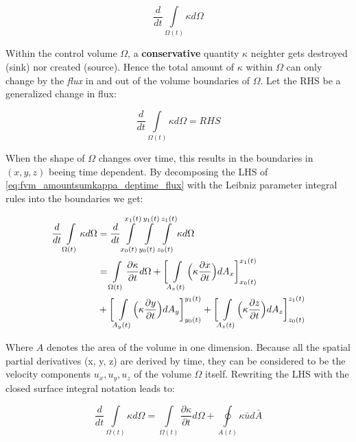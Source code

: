 \begin{equation}\label{eq:fvm_amountsumkappa_deptime}
\frac {d}{dt} \int\limits_{\Omega (t)} \kappa d \Omega
\end{equation}

Within the control volume $\Omega$, a \textbf{conservative} quantity $\kappa$  neighter gets destroyed (sink) nor created (source). Hence the total amount of 
$\kappa$ within $\Omega$ can only change by the \emph{flux} in and out of the volume boundaries of $\Omega$. Let the RHS be a generalized change in flux:

\begin{equation}\label{eq:fvm_amountsumkappa_deptime_flux}
\frac {d}{dt} \int\limits_{\Omega (t)} \kappa d \Omega = RHS
\end{equation}

When the shape of $\Omega$ changes over time, this results in the boundaries in  $(x, y, z)$ beeing time dependent. By decomposing the LHS of \ref{eq:fvm_amountsumkappa_deptime_flux} with the Leibniz parameter integral rules into the boundaries we get:

\begin{equation}\label{eq:fvm_amountsumkappa_deptime_decomp}
\begin{split}
\frac {d}{dt} \int\limits_{\Omega (t)} \kappa d \Omega &=
\frac {d}{dt} \int\limits_{x_{0}(t)}^{x_{1}(t)} \int\limits_{y_{0}(t)}^{y_{1}(t)} \int\limits_{z_{0}(t)}^{z_{1}(t)} \kappa d \Omega \\ &= 
\int\limits_{\Omega (t)} \frac{\partial \kappa}{\partial t} d \Omega  + 
\biggl [\int\limits_{A_{x}(t)} \Bigl ( \kappa \frac{\partial x}{\partial t} \Bigr) d A_{x} \biggr]_{x_{0}(t)}^{x_{1}(t)}    \\ &+ 
\biggl [\int\limits_{A_{y}(t)} \Bigl ( \kappa \frac{\partial y}{\partial t} \Bigr) d A_{y} \biggr]_{y_{0}(t)}^{y_{1}(t)}   +
\biggl [\int\limits_{A_{z}(t)} \Bigl ( \kappa \frac{\partial z}{\partial t} \Bigr) d A_{z} \biggr]_{z_{0}(t)}^{z_{1}(t)}
\end{split}
\end{equation}

Where $A$ denotes the area of the volume in one dimension. Because all the spatial partial derivatives (x, y, z) are derived by time, they can be considered to be the velocity components $u_{x}, u_{y}, u_{z}$ of the volume $\Omega$ itself. Rewriting the LHS with the closed surface integral notation leads to:

\begin{equation}\label{eq:fvm_amountsumkappa_deptime_oint}
\frac {d}{dt} \int\limits_{\Omega (t)} \kappa d \Omega = 
\int\limits_{\Omega (t)} \frac{\partial \kappa}{\partial t} d \Omega  + 
\oint\limits_{A(t)} \kappa \bar{u} d \bar{A}   
\end{equation}

